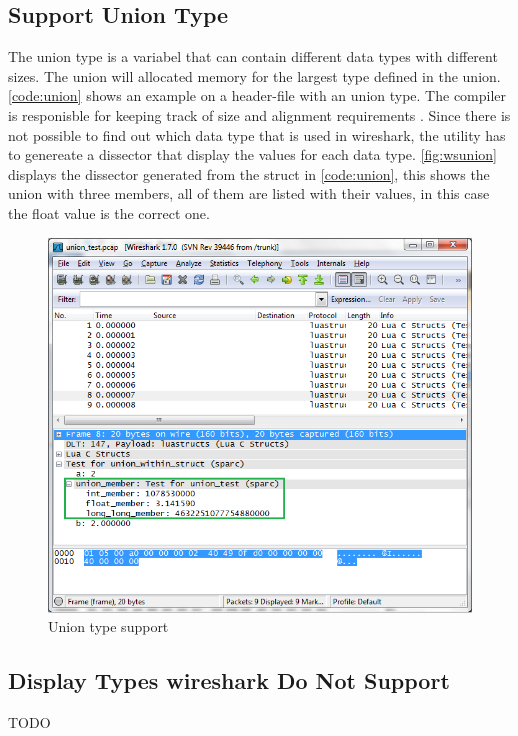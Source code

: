 \subsection{Support Union Type}
The \gls{union} type is a variabel that can contain different data types with 
different sizes. The \gls{union} will allocated memory for the largest type defined 
in the \gls{union}. \autoref{code:union} shows an example on a header-file with an 
\gls{union} type. The compiler is responisble for keeping track of size and 
alignment requirements\cite[p.147]{Kerninghan1988} . Since there is not 
possible to find out which data type that is used in \Gls{wireshark}, the \gls{utility} 
has to genereate a \gls{dissector} that display the values for each data type. 
\autoref{fig:wsunion} displays the \gls{dissector} generated from the struct in 
\autoref{code:union}, this shows the \gls{union} with three members, all of them are 
listed with their values, in this case the float value is the correct one.

\begin{figure}[ht]
	\center
	\includegraphics[width=\textwidth]{./sprints/img/wireshark_union}
	\caption{Union type support\label{fig:wsunion}}
\end{figure}



\subsection{Display Types \Gls{wireshark} Do Not Support}
TODO

